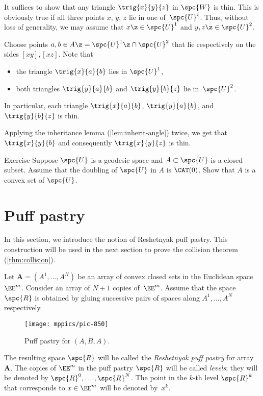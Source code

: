 It suffices to show that any triangle $\trig {x}{y}{z}$ 
in $\spc{W}$ is thin.
This is obviously true if all three points $x$, $y$, $z$ lie in one of~$\spc{U}^i$.
Thus, without loss of generality, we may assume that $x\z\in\spc{U}^1$ and $y,z\z\in\spc{U}^2$.


Choose points $a,b\in A\z=\spc{U}^1\z\cap\spc{U}^2$ 
that lie respectively on the sides $[xy], [xz]$.
Note that

\begin{itemize}
\item the triangle $\trig{x}{a}{b}$ lies in $\spc{U}^1$,
\item both triangles $\trig{y}{a}{b}$ and $\trig{y}{b}{z}$ lie in~$\spc{U}^2$.
\end{itemize}
In particular, each triangle $\trig{x}{a}{b}$,
$\trig{y}{a}{b}$, and $\trig{y}{b}{z}$ is thin.

Applying the inheritance lemma (\ref{lem:inherit-angle}) twice, 
we get that $\trig {x}{y}{b}$ 
and consequently $\trig {x}{y}{z}$ is thin.
\qeds

\begin{thm}{Exercise}\label{ex:reshetnyak-doubling}
Suppose $\spc{U}$ is a geodesic space and $A\subset \spc{U}$ is a closed subset.
Assume that the doubling of $\spc{U}$ in $A$ is $\CAT(0)$. 
Show that $A$ is a convex set of $\spc{U}$.
\end{thm}



\section{Puff pastry}\label{sec:puff-pastry}

In this section, we introduce 
the notion of 
Reshetnyak puff pastry.  This  construction will be used in the next section to prove the collision theorem (\ref{thm:collision}).

Let $\bm{A}=(A^1,\dots,A^N)$ be an array of convex closed sets in the Euclidean space~$\EE^m$.
Consider an array of $N+1$ copies of~$\EE^m$.
Assume that the space $\spc{R}$ is 
obtained by
gluing successive pairs of spaces along  $A^1,\dots,A^N$ respectively.


\begin{figure}[ht!]
\vskip-0mm
\centering
\texttt{[image: mppics/pic-850]}
\caption*{Puff pastry for $(A,B,A)$.}
\end{figure}

The resulting space $\spc{R}$  will be called 
the
\emph{Reshetnyak puff pastry} for array~$\bm{A}$.
The copies of $\EE^m$ in the puff pastry $\spc{R}$
will be called {}\emph{levels};
they will be denoted by $\spc{R}^0,\dots,\spc{R}^N$.
The point in the $k$-th level $\spc{R}^k$
that corresponds to $x\in \EE^m$
will be denoted by~$x^k$.

